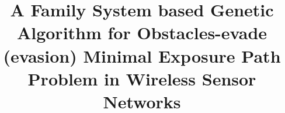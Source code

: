 \documentclass[final]{elsarticle}
\begin{document}
\begin{frontmatter}
\title{A Family System based Genetic Algorithm for  Obstacles-evade (evasion) Minimal Exposure Path Problem in Wireless Sensor Networks}

%
%
%
\begin{abstract}

\end{abstract}
\end{frontmatter}
\end{document}
